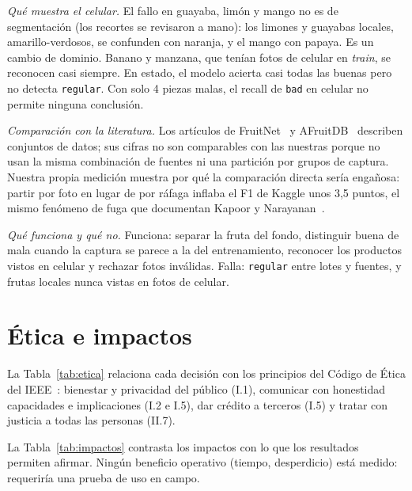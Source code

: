 \documentclass[conference]{IEEEtran}
\newcommand{\cls}[1]{\texttt{#1}}
\begin{document}
\emph{Qué muestra el celular.} El fallo en guayaba, limón y mango no es de segmentación (los recortes se revisaron a mano): los limones y guayabas locales, amarillo-verdosos, se confunden con naranja, y el mango con papaya. Es un cambio de dominio. Banano y manzana, que tenían fotos de celular en \emph{train}, se reconocen casi siempre. En estado, el modelo acierta casi todas las buenas pero no detecta \cls{regular}. Con solo 4 piezas malas, el recall de \cls{bad} en celular no permite ninguna conclusión.

\emph{Comparación con la literatura.} Los artículos de FruitNet~\cite{meshram2022} y AFruitDB~\cite{mojumdar2025} describen conjuntos de datos; sus cifras no son comparables con las nuestras porque no usan la misma combinación de fuentes ni una partición por grupos de captura. Nuestra propia medición muestra por qué la comparación directa sería engañosa: partir por foto en lugar de por ráfaga inflaba el F1 de Kaggle unos 3,5 puntos, el mismo fenómeno de fuga que documentan Kapoor y Narayanan~\cite{kapoor2023}.

\emph{Qué funciona y qué no.} Funciona: separar la fruta del fondo, distinguir buena de mala cuando la captura se parece a la del entrenamiento, reconocer los productos vistos en celular y rechazar fotos inválidas. Falla: \cls{regular} entre lotes y fuentes, y frutas locales nunca vistas en fotos de celular.

\section{Ética e impactos}

La Tabla~\ref{tab:etica} relaciona cada decisión con los principios del Código de Ética del IEEE~\cite{ieee_ethics}: bienestar y privacidad del público (I.1), comunicar con honestidad capacidades e implicaciones (I.2 e I.5), dar crédito a terceros (I.5) y tratar con justicia a todas las personas (II.7).

La Tabla~\ref{tab:impactos} contrasta los impactos con lo que los resultados permiten afirmar. Ningún beneficio operativo (tiempo, desperdicio) está medido: requeriría una prueba de uso en campo.
\end{document}
